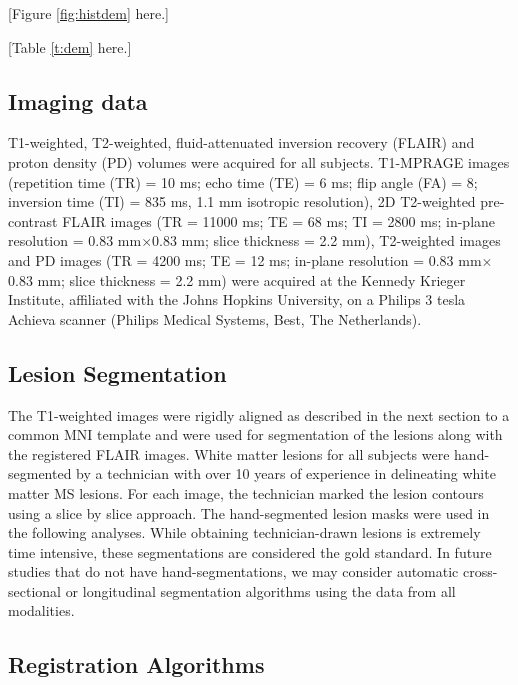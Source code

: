 \documentclass[10pt]{article}
\begin{document}
[Figure \ref{fig:histdem} here.]

[Table \ref{t:dem} here.]


\subsection*{Imaging data}

T1-weighted, T2-weighted, fluid-attenuated inversion recovery (FLAIR)
and proton density (PD) volumes were acquired for all subjects. T1-MPRAGE images (repetition time (TR) = 10 ms; echo time (TE) = 6 ms; flip angle
(FA) = 8; inversion time (TI) = 835 ms, 1.1 mm isotropic resolution), 2D T2-weighted pre-contrast FLAIR images (TR = 11000 ms; TE = 68 ms; TI = 2800 ms; in-plane resolution
= 0.83 mm$\times$0.83 mm; slice thickness = 2.2 mm), T2-weighted images
and PD images (TR = 4200 ms; TE = 12 ms; in-plane resolution = 0.83
mm$\times$0.83 mm; slice thickness = 2.2 mm) were acquired at the Kennedy Krieger Institute, affiliated with the Johns Hopkins University, on a Philips 3 tesla Achieva scanner (Philips Medical Systems, Best, The Netherlands).


\subsection*{Lesion Segmentation}

The T1-weighted images were rigidly aligned as described in the next section to a common MNI template and were used for segmentation of the lesions along with the registered FLAIR images. White matter lesions for all subjects were hand-segmented by a technician with over 10 years of experience in delineating white matter MS lesions. For each image, the technician marked the lesion contours using a slice by slice approach. The hand-segmented lesion masks were used in the following analyses. While obtaining technician-drawn lesions is extremely time intensive, these segmentations are considered the gold standard. In future studies that do not have hand-segmentations, we may consider automatic cross-sectional \cite{sweeney2013oasis} or longitudinal \cite{sweeney2013automatic} segmentation algorithms using the data from all modalities.


\subsection*{Registration Algorithms}
\end{document}
